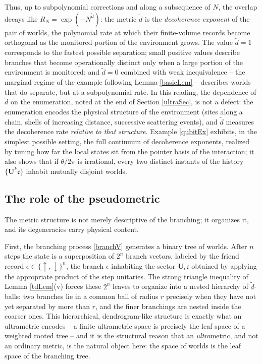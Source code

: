 \documentclass[twoside,11pt,letter]{article}
\def\fc{{\mathfrak{c}}}
\theoremstyle{definition}
\theoremstyle{definition}
\theoremstyle{plain}
\begin{document}
Thus, up to subpolynomial corrections and along a subsequence of $N$, the overlap decays like $R_N=\exp(-N^{\tilde d})$: the metric $\tilde d$ is the \emph{decoherence exponent} \cite{Z03} of the pair of worlds, the polynomial rate at which their finite-volume records become orthogonal as the monitored portion of the environment grows. The value $\tilde d=1$ corresponds to the fastest possible separation; small positive values describe branches that become operationally distinct only when a large portion of the environment is monitored; and $\tilde d=0$ combined with weak inequivalence -- the marginal regime of the example following Lemma \ref{basicLem} -- describes worlds that do separate, but at a subpolynomial rate. In this reading, the dependence of $\tilde d$ on the enumeration, noted at the end of Section \ref{ultraSec}, is not a defect: the enumeration encodes the physical structure of the environment (sites along a chain, shells of increasing distance, successive scattering events), and $\tilde d$ measures the decoherence rate \emph{relative to that structure}. Example \ref{qubitEx} exhibits, in the simplest possible setting, the full continuum of decoherence exponents, realized by tuning how far the local states sit from the pointer basis of the interaction; it also shows that if $\theta/2\pi$ is irrational, every two distinct instants of the history $\{\mathbf{U}^k\fc\}$ inhabit mutually disjoint worlds.

\subsection{The role of the pseudometric}\label{pseudometricRoleSubsec}

The metric structure is not merely descriptive of the branching; it organizes it, and its degeneracies carry physical content.

First, the branching process \eqref{branchV} generates a binary tree of worlds. After $n$ steps the state is a superposition of $2^n$ branch vectors, labeled by the friend record $\epsilon\in\{\uparrow,\downarrow\}^n$, the branch $\epsilon$ inhabiting the sector $\mathbf{U}_\epsilon\fc$ obtained by applying the appropriate product of the step unitaries. The strong triangle inequality of Lemma \ref{tdLem}(v) forces these $2^n$ leaves to organize into a nested hierarchy of $\tilde d$-balls: two branches lie in a common ball of radius $r$ precisely when they have not yet separated by more than $r$, and the finer branchings are nested inside the coarser ones. This hierarchical, dendrogram-like structure is exactly what an ultrametric encodes -- a finite ultrametric space is precisely the leaf space of a weighted rooted tree -- and it is the structural reason that an \emph{ultra}metric, and not an ordinary metric, is the natural object here: the space of worlds is the leaf space of the branching tree.
\end{document}
